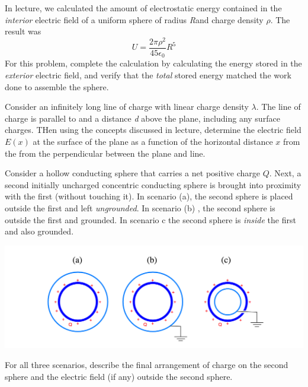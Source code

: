 \documentclass[11pt,letterpaper,boxed]{hmcpset}
\begin{document}
\begin{solution}
\vfill
\end{solution}
\newpage

\begin{problem}
In lecture, we calculated the amount of electrostatic energy contained in the \textit{interior} electric field of a uniform sphere of radius \textit{R}and charge density $\rho$. The result was 
$$ U =\frac{2\pi \rho^2}{45 \epsilon_0}R^5$$
For this problem, complete the calculation by calculating the energy stored in the \textit{exterior} electric field, and verify that the \textit{total} stored energy matched the work done to assemble the sphere. 
\end{problem}

\begin{solution}
\vfill
\end{solution}
\newpage

\begin{problem}[4.]
Consider an infinitely long line of charge with linear charge density $\lambda$. The line of charge is parallel to and a distance \textit{d} above the plane, including any surface charges. THen using the concepts discussed in lecture, determine the electric field $E(x)$ at the surface of the plane as a function of the horizontal distance $x$ from the from the perpendicular between the plane and line.  
\end{problem}

\begin{solution}
\vfill
\end{solution}
\newpage

\begin{problem}[5.]
Consider a hollow conducting sphere that carries a net positive charge $Q$. Next, a second initially uncharged concentric conducting sphere is brought into proximity with the first (without touching  it). In scenario (a), the second sphere is placed outside the first and left \textit{ungrounded}. In scenario (b) , the second sphere is outside the first and grounded. In scenario c the second sphere is \textit{inside} the first and also grounded. 
\begin{center}
\includegraphics[scale=0.6]{5.png}
\end{center}
For all three scenarios, describe the final arrangement of charge on the second sphere and the electric field (if any) outside the second sphere. 
\end{problem}
\end{document}
